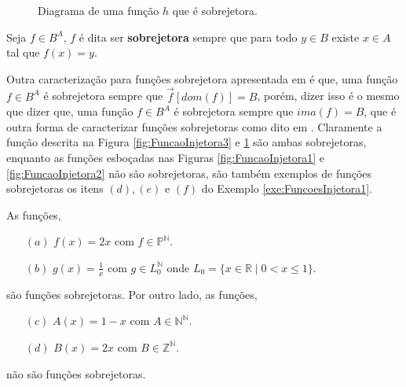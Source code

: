 \begin{figure}[h]
	\centering
	\caption{Diagrama de uma função $h$ que é sobrejetora.}
	\label{fig:FuncaoSobrejetora1}	
\end{figure}

\begin{definicao}\label{def:FuncaoSobrejetora}
	Seja $f \in B^A$, $f$ é dita ser \textbf{sobrejetora} sempre que para todo $y \in B$ existe $x \in A$ tal que $f(x) = y$.
\end{definicao}

Outra caracterização para funções sobrejetora apresentada em \cite{lipschutz1971-Topo} é que, uma função $f \in B^A$ é sobrejetora sempre que $\overrightarrow{f}[dom(f)] = B$, porém, dizer isso é o mesmo que dizer que,  uma função $f \in B^A$ é sobrejetora sempre que $ima(f) = B$, que é outra forma de caracterizar funções sobrejetoras como dito em \cite{carmo2013}. Claramente a função descrita na Figura \ref{fig:FuncaoInjetora3} e \ref{fig:FuncaoSobrejetora1} são ambas sobrejetoras, enquanto as funções esboçadas nas Figuras \ref{fig:FuncaoInjetora1} e \ref{fig:FuncaoInjetora2} não são sobrejetoras, são também exemplos de funções sobrejetoras os itens $(d), (e)$ e $(f)$ do Exemplo \ref{exe:FuncoesInjetora1}.

\begin{exemplo}\label{exe:FuncaoSobrejetora}
	As funções,
	\begin{itemize}
		\item[$(a)$] $f(x) = 2x$ com $f \in \mathbb{P}^\mathbb{N}$.
		\item[$(b)$] $g(x) = \displaystyle\frac{1}{x}$ com $g \in L_0^{\mathbb{N}}$ onde $L_0 = \{x \in \mathbb{R} \mid 0 < x \leq 1\}$.
	\end{itemize} 
	são funções sobrejetoras. Por outro lado, as funções,
	\begin{itemize}
		\item[$(c)$] $A(x) = 1 - x$ com $A \in \mathbb{N}^\mathbb{N}$.
		\item[$(d)$] $B(x) = 2x$ com $B \in \mathbb{Z}^\mathbb{N}$.
	\end{itemize}
	não são funções sobrejetoras.
\end{exemplo}

